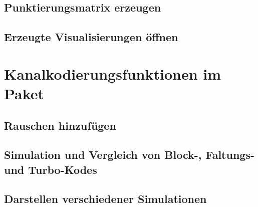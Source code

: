 \subsection{Punktierungsmatrix erzeugen}
\label{sec:interface_punctuation}


\subsection{Erzeugte Visualisierungen öffnen}
\label{sec:interface_openPDF}


\section{Kanalkodierungsfunktionen im Paket}
\label{sec:interface_channelFunctions}

\subsection{Rauschen hinzufügen}
\label{sec:interface_applyNoise}


\subsection{Simulation und Vergleich von Block-, Faltungs- und Turbo-Kodes}
\label{sec:interface_channelcodingSimulation}


\subsection{Darstellen verschiedener Simulationen}
\label{sec:interface_plotSimulationData}

